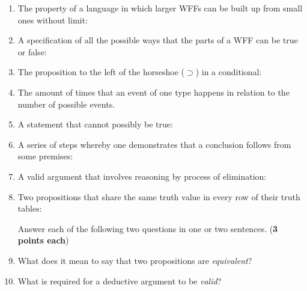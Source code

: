 \documentclass[10pt]{article}
\begin{document}
\begin{enumerate}\setlength\itemsep{5mm}
 \item The property of a language in which larger WFFs can be built up from small ones without limit:\underline{\hspace{2in}}
 
 \item A specification of all the possible ways that the parts of a WFF can be true or false:\underline{\hspace{2in}}
 
 \item The proposition to the left of the horseshoe ($\supset$) in a conditional:\underline{\hspace{2in}}
 
 \item The amount of times that an event of one type happens in relation to the number of possible events.\underline{\hspace{2in}}
 
 \item A statement that cannot possibly be true:\underline{\hspace{2in}}
 
 \item A series of steps whereby one demonstrates that a conclusion follows from some premises: \underline{\hspace{2in}}
 
 \item A valid argument that involves reasoning by process of elimination:\underline{\hspace{2in}}
 
 \item Two propositions that share the same truth value in every row of their truth tables:\underline{\hspace{2in}}
 

Answer each of the following two questions in one or two sentences. (\textbf{3 points each})

\setlength\itemsep{1.5cm}

\item What does it mean to say that two propositions are \textit{equivalent}?

\item What is required for a deductive argument to be \textit{valid}?


\vspace{.75cm}


\end{enumerate}
\end{document}
